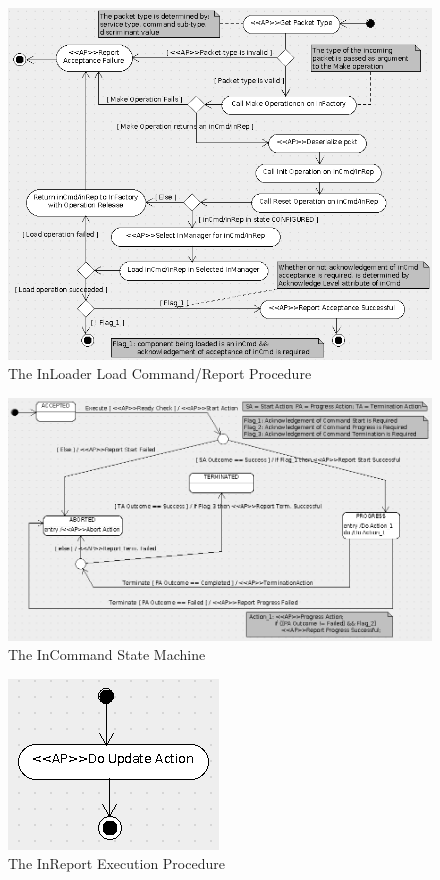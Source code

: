 \documentclass[a4paper,10pt]{article}
\begin{document}
\begin{figure}[h]
 \centering
 \includegraphics[scale=0.35,keepaspectratio=true]{InLoaderLoadCommandReport.png}
 \caption{The InLoader Load Command/Report Procedure}
 \label{fig:InLoaderLoadCommandReport}
\end{figure}

\begin{figure}[h]
 \centering
 \includegraphics[scale=0.35,keepaspectratio=true]{InCommand.png}
 \caption{The InCommand State Machine}
 \label{fig:InCommand}
\end{figure}

\begin{figure}[h]
 \centering
 \includegraphics[scale=0.35,keepaspectratio=true]{InReportExecution.png}
 \caption{The InReport Execution Procedure}
 \label{fig:InReportExecution}
\end{figure}
\end{document}
